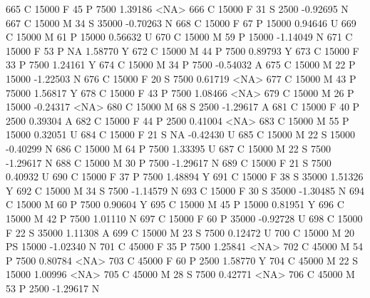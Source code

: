 \documentclass{article}
\begin{document}
\begin{Schunk}
\begin{Soutput}
665       C      15000   F  45         P   7500   1.39186 <NA>
666       C      15000   F  31         S   2500  -0.92695    N
667       C      15000   M  34         S  35000  -0.70263    N
668       C      15000   F  67         P  15000   0.94646    U
669       C      15000   M  61         P  15000   0.56632    U
670       C      15000   M  59         P  15000  -1.14049    N
671       C      15000   F  53         P     NA   1.58770    Y
672       C      15000   M  44         P   7500   0.89793    Y
673       C      15000   F  33         P   7500   1.24161    Y
674       C      15000   M  34         P   7500  -0.54032    A
675       C      15000   M  22         P  15000  -1.22503    N
676       C      15000   F  20         S   7500   0.61719 <NA>
677       C      15000   M  43         P  75000   1.56817    Y
678       C      15000   F  43         P   7500   1.08466 <NA>
679       C      15000   M  26         P  15000  -0.24317 <NA>
680       C      15000   M  68         S   2500  -1.29617    A
681       C      15000   F  40         P   2500   0.39304    A
682       C      15000   F  44         P   2500   0.41004 <NA>
683       C      15000   M  55         P  15000   0.32051    U
684       C      15000   F  21         S     NA  -0.42430    U
685       C      15000   M  22         S  15000  -0.40299    N
686       C      15000   M  64         P   7500   1.33395    U
687       C      15000   M  22         S   7500  -1.29617    N
688       C      15000   M  30         P   7500  -1.29617    N
689       C      15000   F  21         S   7500   0.40932    U
690       C      15000   F  37         P   7500   1.48894    Y
691       C      15000   F  38         S  35000   1.51326    Y
692       C      15000   M  34         S   7500  -1.14579    N
693       C      15000   F  30         S  35000  -1.30485    N
694       C      15000   M  60         P   7500   0.90604    Y
695       C      15000   M  45         P  15000   0.81951    Y
696       C      15000   M  42         P   7500   1.01110    N
697       C      15000   F  60         P  35000  -0.92728    U
698       C      15000   F  22         S  35000   1.11308    A
699       C      15000   M  23         S   7500   0.12472    U
700       C      15000   M  20        PS  15000  -1.02340    N
701       C      45000   F  35         P   7500   1.25841 <NA>
702       C      45000   M  54         P   7500   0.80784 <NA>
703       C      45000   F  60         P   2500   1.58770    Y
704       C      45000   M  22         S  15000   1.00996 <NA>
705       C      45000   M  28         S   7500   0.42771 <NA>
706       C      45000   M  53         P   2500  -1.29617    N

\end{Soutput}
\end{Schunk}
\end{document}
